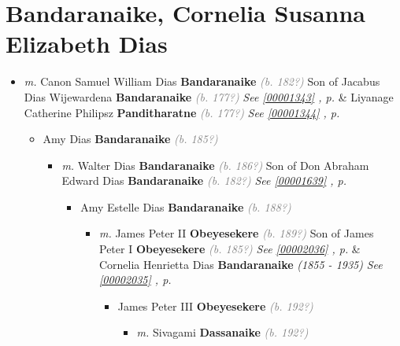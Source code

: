 \documentclass[10pt, openany]{book}
\begin{document}
\chapter{Bandaranaike, Cornelia Susanna Elizabeth Dias}
\label{00001348}
\textcolor{slmaroon}{\textit{}}
\begin{itemize}
\item{\textit{m.} Canon Samuel William Dias \textbf{Bandaranaike} \textcolor{gray}{\textit{(b. 182?)}} Son of  Jacabus Dias Wijewardena \textbf{Bandaranaike} \textcolor{gray}{\textit{(b. 177?)}} \textcolor{slteal}{\textit{See  \autoref{00001343} \textit{, p. \pageref{00001343} }}}  \&  Liyanage Catherine Philipsz \textbf{Panditharatne} \textcolor{gray}{\textit{(b. 177?)}} \textcolor{slteal}{\textit{See  \autoref{00001344} \textit{, p. \pageref{00001344} }}}   \label{couple:00001347:00001348} \begin{itemize}
\item{Amy Dias \textbf{Bandaranaike} \textcolor{gray}{\textit{(b. 185?)}}
\begin{itemize}
\item{\textit{m.} Walter Dias \textbf{Bandaranaike} \textcolor{gray}{\textit{(b. 186?)}} Son of  Don Abraham Edward Dias \textbf{Bandaranaike} \textcolor{gray}{\textit{(b. 182?)}} \textcolor{slteal}{\textit{See  \autoref{00001639} \textit{, p. \pageref{00001639} }}}   \label{couple:00001488:00001489} \begin{itemize}
\item{Amy Estelle Dias \textbf{Bandaranaike} \textcolor{gray}{\textit{(b. 188?)}}
\begin{itemize}
\item{\textit{m.} James Peter II \textbf{Obeyesekere} \textcolor{gray}{\textit{(b. 189?)}} Son of  James Peter I \textbf{Obeyesekere} \textcolor{gray}{\textit{(b. 185?)}} \textcolor{slteal}{\textit{See  \autoref{00002036} \textit{, p. \pageref{00002036} }}}  \&  Cornelia Henrietta Dias \textbf{Bandaranaike} \textcolor{slorange}{\textit{(1855 - 1935)}} \textcolor{slteal}{\textit{See  \autoref{00002035} \textit{, p. \pageref{00002035} }}}   \label{couple:00001491:00001492} \begin{itemize}
\item{James Peter III \textbf{Obeyesekere} \textcolor{gray}{\textit{(b. 192?)}}
\begin{itemize}
\item{\textit{m.} Sivagami \textbf{Dassanaike} \textcolor{gray}{\textit{(b. 192?)}}   \label{couple:00001493:00001494} \begin{itemize}

\end{itemize}}
\end{itemize}}
\end{itemize}}
\end{itemize}}
\end{itemize}}
\end{itemize}}
\end{itemize}}
\end{itemize}
\end{document}
